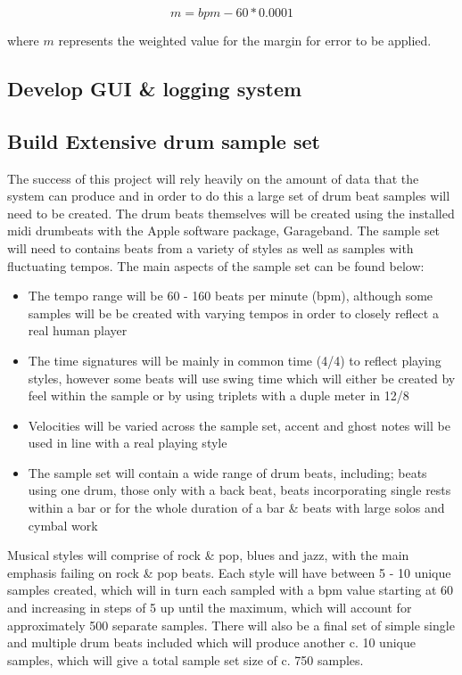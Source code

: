 \documentclass[a4paper, 11pt]{article}
\begin{document}
\[ m = bpm - 60 * 0.0001\]

where \(m\) represents the weighted value for the margin for error to be applied.

\subsection{Develop GUI \& logging system}


\subsection{Build Extensive drum sample set}
The success of this project will rely heavily on the amount of data that the system can produce and in order to do this a large set of drum beat samples will need to be created. The drum beats themselves will be created using the installed midi drumbeats with the Apple software package, Garageband. The sample set will need to contains beats from a variety of styles as well as samples with fluctuating tempos. The main aspects of the sample set can be found below:

\begin{itemize}
\item The tempo range will be 60 - 160 beats per minute (bpm), although some samples will be be created with varying tempos in order to closely reflect a real human player
\item The time signatures will be mainly in common time (4/4) to reflect playing styles, however some beats will use swing time which will either be created by feel within the sample or by using triplets with a duple meter in 12/8
\item Velocities will be varied across the sample set, accent and ghost notes will be used in line with a real playing style
\item The sample set will contain a wide range of drum beats, including; beats using one drum, those only with a back beat, beats incorporating single rests within a bar or for the whole duration of a bar \& beats with large solos and cymbal work
\end{itemize} 

Musical styles will comprise of rock \& pop, blues and jazz, with the main emphasis failing on rock \& pop beats. Each style will have between 5 - 10 unique samples created, which will in turn each sampled with a bpm value starting at 60 and increasing in steps of 5 up until the maximum, which will account for approximately 500 separate samples. There will also be a final set of simple single and multiple drum beats included which will produce another c. 10 unique samples, which will give a total sample set size of c. 750 samples.
\end{document}
